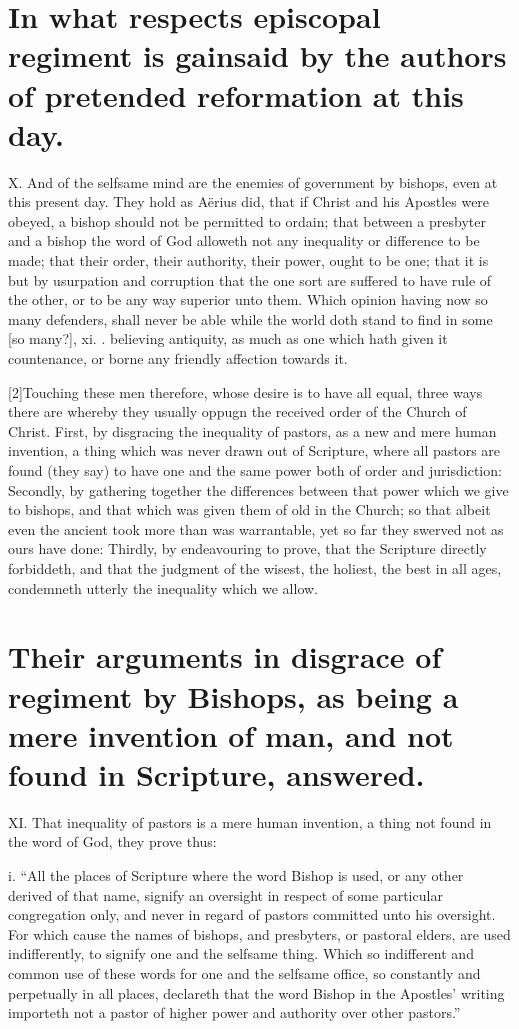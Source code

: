 \section*{In what respects episcopal regiment is gainsaid by the authors of pretended reformation at this day.}

X. And of the selfsame mind are the enemies of government by bishops, even at this present day. They hold as Aërius did, that if Christ and his Apostles were obeyed, a bishop should not be permitted to ordain; that between a presbyter and a bishop the word of God alloweth not any inequality or difference to be made; that their order, their authority, their power, ought to be one; that it is but by usurpation and corruption that the one sort are suffered to have rule of the other, or to be any way superior unto them. Which opinion having now so many defenders, shall never  be able while the world doth stand to find in some [so many?],
 xi. . believing antiquity, as much as one which hath given it countenance, or borne any friendly affection towards it.

[2]Touching these men therefore, whose desire is to have all equal, three ways there are whereby they usually oppugn the received order of the Church of Christ. First, by disgracing the inequality of pastors, as a new and mere human invention, a thing which was never drawn out of Scripture, where all pastors are found (they say) to have one and the same power both of order and jurisdiction: Secondly, by gathering together the differences between that power which we give to bishops, and that which was given them of old in the Church; so that albeit even the ancient took more than was warrantable, yet so far they swerved not as ours have done: Thirdly, by endeavouring to prove, that the Scripture directly forbiddeth, and that the judgment of the wisest, the holiest, the best in all ages, condemneth utterly the inequality which we allow.

\section*{Their arguments in disgrace of regiment by Bishops, as being a mere invention of man, and not found in Scripture, answered.}

XI. That inequality of pastors is a mere human invention, a thing not found in the word of God, they prove thus:

i. “All the places of Scripture where the word Bishop is used, or any other derived of that name, signify an oversight in respect of some particular congregation only, and never in regard of pastors committed unto his oversight. For which cause the names of bishops, and presbyters, or pastoral elders, are used indifferently, to signify one and the selfsame thing. Which so indifferent and common use of these words for one and the selfsame office, so constantly and perpetually in all places, declareth that the word Bishop in the Apostles’ writing importeth not a pastor of higher power and authority over other pastors.”

